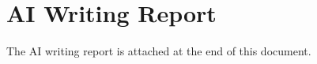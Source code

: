 \begingroup
  \renewcommand{\addcontentsline}[3]{}
  \chapter{AI Writing Report}
\endgroup
{}
\label{app:aireport}

The AI writing report is attached at the end of this document.

